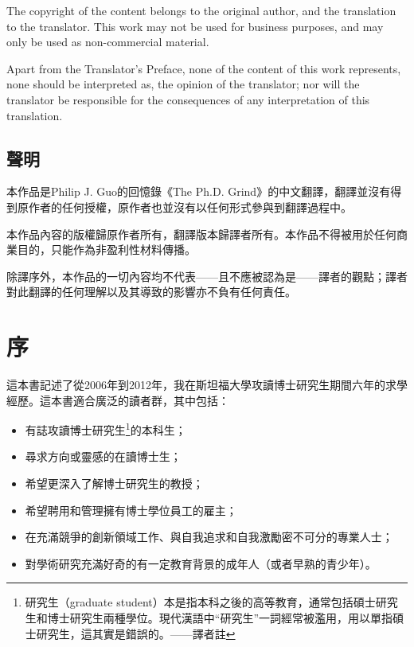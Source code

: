 \documentclass[12pt,UTF8,nofonts]{book}
\begin{document}
The copyright of the content belongs to the original author, and the translation to the translator. This work may not be used for business purposes, and may only be used as non-commercial material.

Apart from the Translator's Preface, none of the content of this work represents, none should be interpreted as, the opinion of the translator; nor will the translator be responsible for the consequences of any interpretation of this translation.

\section*{聲明}

本作品是Philip J. Guo的回憶錄《The Ph.D. Grind》的中文翻譯，翻譯並沒有得到原作者的任何授權，原作者也並沒有以任何形式參與到翻譯過程中。

本作品內容的版權歸原作者所有，翻譯版本歸譯者所有。本作品不得被用於任何商業目的，只能作為非盈利性材料傳播。

除譯序外，本作品的一切內容均不代表——且不應被認為是——譯者的觀點；譯者對此翻譯的任何理解以及其導致的影響亦不負有任何責任。


\mainmatter

\chapter*{序}
\markboth{}{}

這本書記述了從2006年到2012年，我在斯坦福大學攻讀博士研究生期間六年的求學經歷。這本書適合廣泛的讀者群，其中包括：

\begin{itemize}
\item 有誌攻讀博士研究生\footnote{研究生（graduate student）本是指本科之後的高等教育，通常包括碩士研究生和博士研究生兩種學位。現代漢語中“研究生”一詞經常被濫用，用以單指碩士研究生，這其實是錯誤的。——譯者註}的本科生；
\item 尋求方向或靈感的在讀博士生；
\item 希望更深入了解博士研究生的教授；
\item 希望聘用和管理擁有博士學位員工的雇主；
\item 在充滿競爭的創新領域工作、與自我追求和自我激勵密不可分的專業人士；
\item 對學術研究充滿好奇的有一定教育背景的成年人（或者早熟的青少年）。
\end{itemize}
\end{document}
